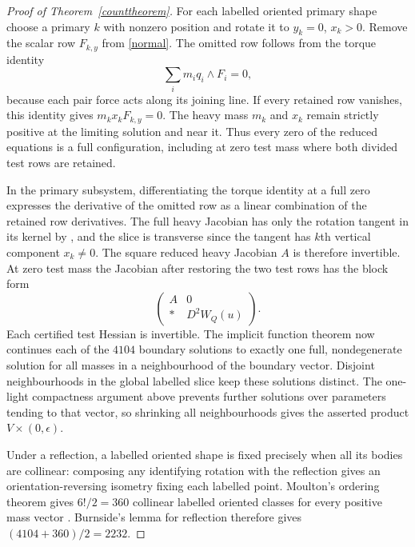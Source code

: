 \documentclass[11pt]{article}
\begin{document}
\begin{proof}[Proof of Theorem~\ref{counttheorem}]
For each labelled oriented primary shape choose a primary $k$ with nonzero position and rotate it to $y_k=0$, $x_k>0$. Remove the scalar row $F_{k,y}$ from \eqref{normal}. The omitted row follows from the torque identity
\[
 \sum_i m_i q_i\wedge F_i=0,
\]
because each pair force acts along its joining line. If every retained row vanishes, this identity gives $m_k x_k F_{k,y}=0$. The heavy mass $m_k$ and $x_k$ remain strictly positive at the limiting solution and near it. Thus every zero of the reduced equations is a full configuration, including at zero test mass where both divided test rows are retained.

In the primary subsystem, differentiating the torque identity at a full zero expresses the derivative of the omitted row as a linear combination of the retained row derivatives. The full heavy Jacobian has only the rotation tangent in its kernel by \cite{equal}, and the slice is transverse since the tangent has $k$th vertical component $x_k\ne0$. The square reduced heavy Jacobian $A$ is therefore invertible. At zero test mass the Jacobian after restoring the two test rows has the block form
\[
 \begin{pmatrix}A&0\\ *&D^2 W_Q(u)\end{pmatrix}.
\]
Each certified test Hessian is invertible. The implicit function theorem now continues each of the $4104$ boundary solutions to exactly one full, nondegenerate solution for all masses in a neighbourhood of the boundary vector. Disjoint neighbourhoods in the global labelled slice keep these solutions distinct. The one-light compactness argument above prevents further solutions over parameters tending to that vector, so shrinking all neighbourhoods gives the asserted product $V\times(0,\epsilon)$.

Under a reflection, a labelled oriented shape is fixed precisely when all its bodies are collinear: composing any identifying rotation with the reflection gives an orientation-reversing isometry fixing each labelled point. Moulton's ordering theorem gives $6!/2=360$ collinear labelled oriented classes for every positive mass vector \cite{moulton}. Burnside's lemma for reflection therefore gives $(4104+360)/2=2232$.


\end{proof}
\end{document}
